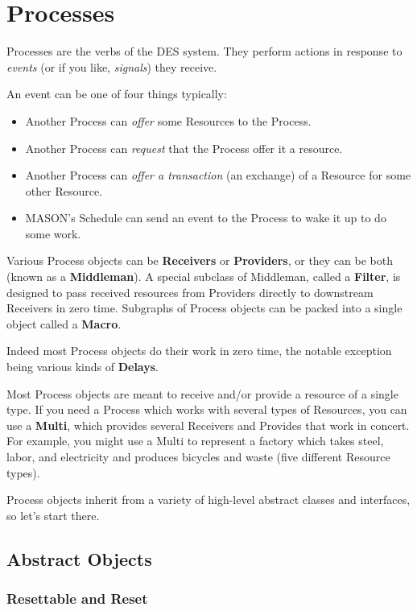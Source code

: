\documentclass[twoside,10pt]{article}
\begin{document}
\section{Processes}

Processes are the verbs of the DES system.  They perform actions in response to {\it events} (or if you like, {\it signals}) they receive.  

An event can be one of four things typically:

\begin{itemize}
\item Another Process can {\it offer} some Resources to the Process.
\item Another Process can {\it request} that the Process offer it a resource.
\item Another Process can {\it offer a transaction} (an exchange) of a Resource for some other Resource.
\item MASON's Schedule can send an event to the Process to wake it up to do some work.
\end{itemize}

Various Process objects can be {\bf Receivers} or {\bf Providers}, or they can be both (known as a {\bf Middleman}).  A special subclass of Middleman, called a {\bf Filter}, is designed to pass received resources from Providers directly to downstream Receivers in zero time.    Subgraphs of Process objects can be packed into a single object called a {\bf Macro}.    

Indeed most Process objects do their work in zero time, the notable exception being various kinds of {\bf Delays}.

Most Process objects are meant to receive and/or provide a resource of a single type.  If you need a Process which works with several types of Resources, you can  use a {\bf Multi}, which provides several Receivers and Provides that work in concert.  For example, you might use a Multi to represent a factory which takes steel, labor, and electricity and produces bicycles and waste (five different Resource types).

Process objects inherit from a variety of high-level abstract classes and interfaces, so let's start there.

\subsection{Abstract Objects}

\subsubsection{Resettable and Reset}
\end{document}
